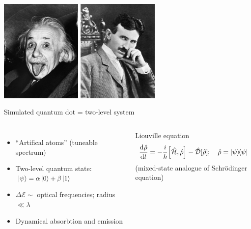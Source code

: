 \documentclass[aspectratio=169]{beamer}
\begin{document}
\begin{frame}
  \begin{center}
    \includegraphics[width=0.3\textwidth]{figures/einstein_tongue.jpg}
    \hspace{0.1cm}
    \includegraphics[width=0.3\textwidth]{figures/tesla_chair.jpg}
  \end{center}
\end{frame}

\begin{frame}{Simulated quantum dot = two-level system}
  \begin{columns}[c]
      \centering
      

      \begin{itemize}
        \item ``Artifical atoms'' (tuneable spectrum)
        \item Two-level quantum state: $\ket*{\psi} = \alpha \ket{0} + \beta \ket{1}$
        \item $\Delta \mathcal{E} \sim$ optical frequencies; radius $\ll \lambda$
        \item Dynamical absorbtion and emission
      \end{itemize}

      \begin{block}{Liouville equation}
        \begin{equation*}
          \dv{\hat{\rho}}{t} = -\frac{i}{\hbar}\commutator{\hat{\mathcal{H}}}{\hat{\rho}} - \hat{\mathcal{D}}\qty[\hat{\rho}]; \quad \hat{\rho} = \dyad{\psi}{\psi}
        \end{equation*}
        \hfill {\tiny(mixed-state analogue of Schr\"odinger equation)}
      \end{block}
  \end{columns}
\end{frame}
\end{document}
